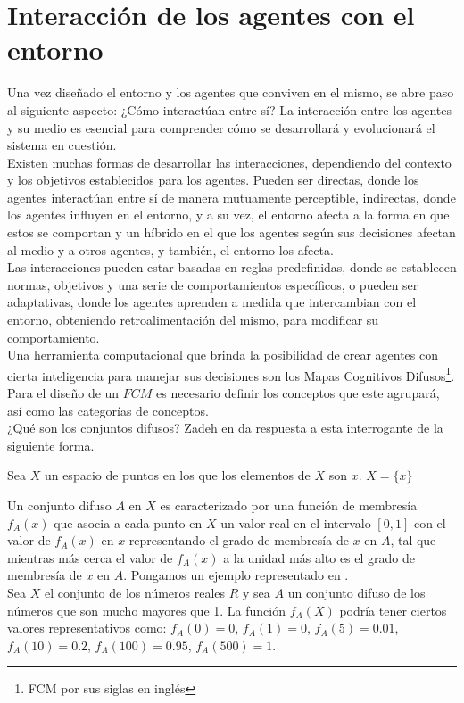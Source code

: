 \section{Interacción de los agentes con el entorno}
Una vez diseñado el entorno y los agentes que conviven en el mismo, se abre paso al siguiente aspecto:
¿Cómo interactúan entre sí? La interacción entre los agentes y su medio es esencial para comprender 
cómo se desarrollará y evolucionará el sistema en cuestión.\\
Existen muchas formas de desarrollar las interacciones, dependiendo del contexto y los objetivos establecidos
para los agentes. Pueden ser directas, donde los agentes interactúan entre sí de manera mutuamente perceptible,
indirectas, donde los agentes influyen en el entorno, y a su vez, el entorno afecta a la forma en que estos se 
comportan y un híbrido en el que los agentes según sus decisiones afectan al medio y a otros agentes, y también, 
el entorno los afecta.\\
Las interacciones pueden estar basadas en reglas predefinidas, donde se establecen normas, objetivos y una serie
de comportamientos específicos, o pueden ser adaptativas, donde los agentes aprenden a medida que intercambian con
el entorno, obteniendo retroalimentación del mismo, para modificar su comportamiento.\\
Una herramienta computacional que brinda la posibilidad de crear agentes con cierta inteligencia para manejar
sus decisiones son los Mapas Cognitivos Difusos\footnote{FCM por sus siglas en inglés}. Para el diseño de un $FCM$ es necesario definir los 
conceptos que este agrupará, así como las categorías de conceptos.\\
¿Qué son los conjuntos difusos? Zadeh en \autocite{Zadeh1965} da respuesta a esta interrogante de la siguiente forma.
\begin{center}
    Sea $X$ un espacio de puntos en los que los elementos de $X$ son $x$. $X = \lbrace x \rbrace$
\end{center}
Un conjunto difuso $A$ en $X$ es caracterizado por una función de membresía $f_A(x)$ que asocia a cada punto en 
$X$ un valor real en el intervalo $[0, 1]$ con el valor de $f_A(x)$ en $x$ representando el 
grado de membresía de $x$ en $A$, tal que mientras más cerca el valor de $f_A(x)$ a la unidad más alto es 
el grado de membresía de $x$ en $A$. Pongamos un ejemplo representado en \autocite{Zadeh1965}.\\
Sea $X$ el conjunto de los números reales $R$ y sea $A$ un conjunto difuso de los números que son mucho mayores que 1.
La función $f_A(X)$ podría tener ciertos valores representativos como: $f_A(0) = 0$, $f_A(1) = 0$,
$f_A(5) = 0.01$, $f_A(10) = 0.2$, $f_A(100) = 0.95$, $f_A(500) = 1$.

